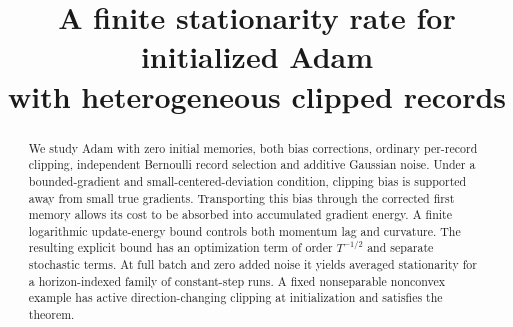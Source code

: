 \documentclass[11pt]{article}
\title{A finite stationarity rate for initialized Adam\\with heterogeneous clipped records}
\author{}
\date{}
\begin{document}
\maketitle

\begin{abstract}
We study Adam with zero initial memories, both bias corrections, ordinary
per-record clipping, independent Bernoulli record selection and additive
Gaussian noise. Under a bounded-gradient and small-centered-deviation
condition, clipping bias is supported away from small true gradients.
Transporting this bias through the corrected first memory allows its cost to
be absorbed into accumulated gradient energy. A finite logarithmic update-energy
bound controls both momentum lag and curvature. The resulting explicit bound
has an optimization term of order $T^{-1/2}$ and separate stochastic terms.
At full batch and zero added noise it yields averaged stationarity for a
horizon-indexed family of constant-step runs. A fixed nonseparable nonconvex
example has active direction-changing clipping at initialization and satisfies
the theorem.
\end{abstract}
\end{document}
